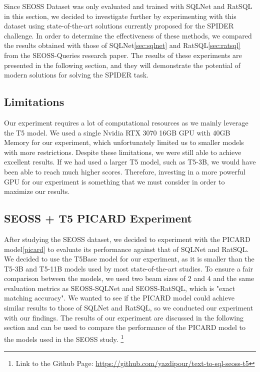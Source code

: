 Since SEOSS Dataset\cite{RATH2019104005} was only evaluated and trained with SQLNet and RatSQL in this section, we decided to investigate further by experimenting with this dataset using state-of-the-art solutions currently proposed for the SPIDER challenge. In order to determine the effectiveness of these methods, we compared the results obtained with those of SQLNet\ref{sec:sqlnet} and RatSQL\ref{sec:ratsql} from the SEOSS-Queries research paper\cite{TOMOVA2022108211}. The results of these experiments are presented in the following section, and they will demonstrate the potential of modern solutions for solving the SPIDER task.

\subsection{Limitations}

Our experiment requires a lot of computational resources as we mainly leverage the T5 model. We used a single Nvidia RTX 3070 16GB GPU with 40GB Memory for our experiment, which unfortunately limited us to smaller models with more restrictions. Despite these limitations, we were still able to achieve excellent results. If we had used a larger T5 model, such as T5-3B, we would have been able to reach much higher scores. Therefore, investing in a more powerful GPU for our experiment is something that we must consider in order to maximize our results.

\subsection{SEOSS + T5 PICARD Experiment}
After studying the SEOSS dataset, we decided to experiment with the PICARD model\ref{picard} to evaluate its performance against that of SQLNet and RatSQL. We decided to use the T5Base model for our experiment, as it is smaller than the T5-3B and T5-11B models used by most state-of-the-art studies. To ensure a fair comparison between the models, we used two beam sizes of 2 and 4 and the same evaluation metrics as SEOSS-SQLNet and SEOSS-RatSQL, which is "exact matching accuracy". We wanted to see if the PICARD model could achieve similar results to those of SQLNet and RatSQL, so we conducted our experiment with our findings. The results of our experiment are discussed in the following section and can be used to compare the performance of the PICARD model to the models used in the SEOSS study.
\footnote[1]{Link to the Github Page: \url{https://github.com/yazdipour/text-to-sql-seoss-t5}}

